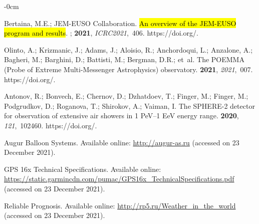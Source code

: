 \documentclass[universe,article,accept,moreauthors,pdftex]{Definitions/mdpi}
\begin{document}
\begin{adjustwidth}{-\extralength}{0cm}
\begin{thebibliography}{999}
Bertaina, M.E.; {JEM-EUSO Collaboration}.
\newblock \hl{An overview of the JEM-EUSO program and results}.
; 
 {\bf 2021}, {\em ICRC2021},~406.
https://doi.org/{\href{https://doi.org/10.22323/1.395.0406}{}}.

Olinto, A.; Krizmanic, J.; Adams, J.; Aloisio, R.; Anchordoqui, L.; Anzalone, A.; Bagheri, M.; Barghini, D.; Battisti, M.; Bergman, D.R.; et~al.
\newblock The {POEMMA} (Probe of Extreme Multi-Messenger Astrophysics)
  observatory.
 {\bf 2021}, {\em
  2021},~007.
\newblock
  https://doi.org/{\href{https://doi.org/10.1088/1475-7516/2021/06/007}{}}.

Antonov, R.; Bonvech, E.; Chernov, D.; Dzhatdoev, T.; Finger, M.; Finger, M.;
  Podgrudkov, D.; Roganova, T.; Shirokov, A.; Vaiman, I.
\newblock The {SPHERE-2} detector for observation of extensive air showers in 1
  {PeV}--1 {EeV} energy range.
 {\bf 2020}, {\em 121},~102460.
\newblock
  https://doi.org/{\href{https://doi.org/10.1016/j.astropartphys.2020.102460}{}}.

Augur Balloon Systems.
\newblock Available online: \url{http://augur-as.ru} (accessed on 23 December 2021).

{GPS} 16x Technical Specifications.
\newblock Available online:
  \url{https://static.garmincdn.com/pumac/GPS16x\_TechnicalSpecifications.pdf}
  (accessed on 23 December 2021).

Reliable Prognosis.
\newblock Available online: \url{http://rp5.ru/Weather\_in\_the\_world} (accessed on 23
  December 2021).


\end{thebibliography}
\end{adjustwidth}
\end{document}
